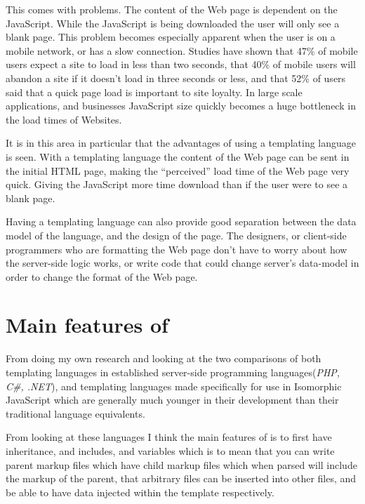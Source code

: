 This comes with problems. The content of the Web page is dependent on the JavaScript. While the JavaScript is being downloaded the user will only see a blank page. This problem becomes especially apparent when the user is on a mobile network, or has a slow connection. Studies have shown that 47\% of mobile users expect a site to load in less than two seconds, that 40\% of mobile users will abandon a site if it doesn't load in three seconds or less, and that 52\% of users said that a quick page load is important to site loyalty\cite{MobileLoad}. In large scale applications, and businesses JavaScript size quickly becomes a huge bottleneck in the load times of Websites\cite{VergeJS}.\newline

It is in this area in particular that the advantages of using a templating language is seen. With a templating language the content of the Web page can be sent in the initial HTML page, making the ``perceived'' load time of the Web page very quick. Giving the JavaScript more time download than if the user were to see a blank page.\newline

Having a templating language can also provide good separation between the data model of the language, and the design of the page. The designers, or client-side programmers who are formatting the Web page don't have to worry about how the server-side logic works, or write code that could change server's data-model in order to change the format of the Web page. 
\newpage
\section{Main features of \languageName{}}
From doing my own research and looking at the two comparisons of both templating languages in established server-side programming languages(\textit{PHP, C\#, .NET})\cite{WikiCompare}, and templating languages made specifically for use in Isomorphic JavaScript which are generally much younger in their development than their traditional language equivalents\cite{JSCompare}.

From looking at these languages I think the main features of \languageName{} is to first have inheritance, and includes, and variables which is to mean that you can write parent markup files which have child markup files which when parsed will include the markup of the parent, that arbitrary \languageName{} files can be inserted into other \languageName{} files, and be able to have data injected within the template respectively. 

